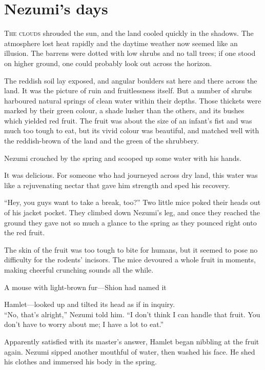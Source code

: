 
\chapter{Nezumi's days}

\lettrine{T}{he clouds} shrouded the sun, and the land cooled quickly in the shadows.
The atmosphere lost heat rapidly and the daytime weather now seemed like
an illusion. The barrens were dotted with low shrubs and no tall trees;
if one stood on higher ground, one could probably look out across the
horizon.

The reddish soil lay exposed, and angular boulders sat here and there
across the land. It was the picture of ruin and fruitlessness itself.
But a number of shrubs harboured natural springs of clean water within
their depths. Those thickets were marked by their green colour, a shade
lusher than the others, and its bushes which yielded red fruit. The
fruit was about the size of an infant's fist and was much too tough to
eat, but its vivid colour was beautiful, and matched well with the
reddish-brown of the land and the green of the shrubbery.

Nezumi crouched by the spring and scooped up some water with his hands.

It was delicious. For someone who had journeyed across dry land, this
water was like a rejuvenating nectar that gave him strength and sped his
recovery.

``Hey, you guys want to take a break, too?'' Two little mice poked their
heads out of his jacket pocket. They climbed down Nezumi's leg, and once
they reached the ground they gave not so much a glance to the spring as
they pounced right onto the red fruit.

The skin of the fruit was too tough to bite for humans, but it seemed to
pose no difficulty for the rodents' incisors. The mice devoured a whole
fruit in moments, making cheerful crunching sounds all the while.

A mouse with light-brown fur---Shion had named it~

Hamlet---looked up and tilted its head as if in inquiry.\\

``No, that's alright,'' Nezumi told him. ``I don't think I can handle
that fruit. You don't have to worry about me; I have a lot to eat.''

Apparently satisfied with its master's answer, Hamlet began nibbling at
the fruit again. Nezumi sipped another mouthful of water, then washed
his face. He shed his clothes and immersed his body in the spring.

